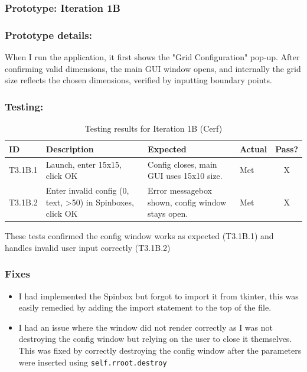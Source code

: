 \subsubsection*{Prototype: Iteration 1B}



\newpage

\subsubsection{Prototype details:}
When I run the application, it first shows the "Grid Configuration" pop-up. After confirming valid dimensions, the main GUI window opens, and internally the grid size reflects the chosen dimensions, verified by inputting boundary points.

\subsubsection{Testing:}
\begin{table}[htbp]
	\centering
	\begin{tabularx}{\textwidth}{|l|X|p{4.5cm}|p{1.5cm}|c|}
		\hline
		\textbf{ID} & \textbf{Description} & \textbf{Expected} & \textbf{Actual} & \textbf{Pass?} \\
		\hline
		T3.1B.1 & Launch, enter 15x15, click OK & Config closes, main GUI uses 15x10 size. & Met & X \\
		\hline
		T3.1B.2 & Enter invalid config (0, text, >50) in Spinboxes, click OK & Error messagebox shown, config window stays open. & Met & X \\
		\hline
	\end{tabularx}
	\caption{Testing results for Iteration 1B (Cerf)}
\end{table}
These tests confirmed the config window works as expected (T3.1B.1) and handles invalid user input correctly (T3.1B.2)

\subsubsection{Fixes}
\begin{itemize}
	\item I had implemented the Spinbox but forgot to import it from tkinter, this was easily remedied by adding the import statement to the top of the file.
	\item I had an issue where the window did not render correctly as I was not destroying the config window but relying on the user to close it themselves. This was fixed by correctly destroying the config window after the parameters were inserted using \verb|self.rroot.destroy|
\end{itemize}

